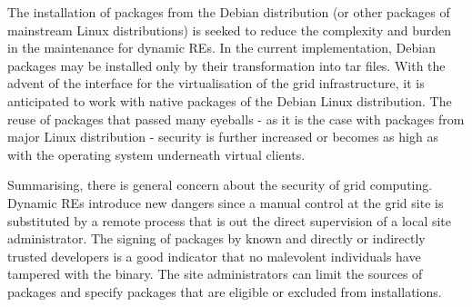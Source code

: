 The installation of packages from the Debian distribution (or other
packages of mainstream Linux distributions) is seeked to reduce the
complexity and burden in the maintenance for dynamic REs. In the
current implementation, Debian packages may be installed only by their
transformation into tar files. With the advent of the interface for
the virtualisation of the grid infrastructure, it is anticipated to
work with native packages of the Debian Linux distribution. The reuse
of packages that passed many eyeballs - as it is the case with packages
from major Linux distribution - security is further increased or becomes
as high as with the operating system underneath virtual clients.

Summarising, there is general concern about the security of grid
computing.  Dynamic REs introduce new dangers since a
manual control at the grid site is substituted by a remote process that
is out the direct supervision of a local site administrator. The signing
of packages by known and directly or indirectly trusted developers is
a good indicator that no malevolent individuals have tampered with the
binary. The site administrators can limit the sources of packages and
specify packages that are eligible or excluded from installations.



% 
